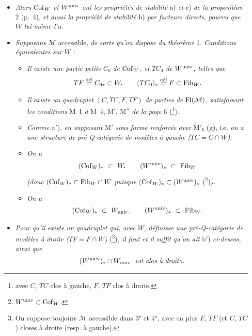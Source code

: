 \begin{itemize}[leftmargin=2.5em]
\item[\circled{1}] \textit{Alors} $\mathrm{Cof}_W$ \textit{et} $W^{\mathrm{univ}}$ \textit{ont les propriétés de stabilité} a) \textit{et} c) \textit{de la proposition} 2 (p.~4), \textit{et aussi la propriété de stabilité} b) \textit{par facteurs directs, pourvu que} $W$ \textit{lui-même l'a.}

\item[\circled{2}] \textit{Supposons} $\mathcal{M}$ accessible, \textit{de sorte qu'on dispose du théorème} 1. \textit{Conditions équivalentes sur} $W$ \textit{:}


\begin{itemize}[leftmargin=2.5em]
\item[a)] \textit{Il existe une partie petite} $C_0$ \textit{de} $\mathrm{Cof}_W$\textit{, et} $TC_0$ \textit{de} $W^{\mathrm{univ}}$\textit{, telles que}
\[ TF \overset{\text{déf}}{=} C_{0*} \subset W, \qquad (TC_0)_* \overset{\text{déf}}{=} F \subset \mathrm{Fib}_W. \]

\item[a$'$)] \textit{Il existe un quadruplet} $(C,TC,F,TF)$ \textit{de parties de} $\mathrm{Fl}(\mathcal{M})$\textit{, satisfaisant les conditions} M~1 \textit{à} M~4, M$'$, M$''$ \textit{de la page} 6 (\footnote[10]{avec $C$, $TC$ clos à gauche, $F$, $TF$ clos à droite.}).

\item[a$''$)] \textit{Comme} a$'$)\textit{, en supposant} M$'$ \textit{sous forme renforcée avec} M$'_0$ (g), i.e. \textit{on a une structure de pré-Q-catégorie de modèles à gauche (}$TC = C \cap W$\textit{).}

\item[b)] \textit{On a}
\[ (\Cof_W)_* \ \subset\ W, \qquad (W^{\univ})_* \ \subset\ \Fib_W \]
\textit{(donc} $(\mathrm{Cof}_W)_* \subset \mathrm{Fib}_W \cap W$ \textit{puisque} $(\mathrm{Cof}_W)_* \subset (W^{\mathrm{univ}})_*$ (\footnote[11]{$W^{\mathrm{univ}} \subset \mathrm{Cof}_W$.})\textit{).}

\item[b$'$)] \textit{On a}
\[ (\Cof_W)_* \ \subset\ W_{\univ}, \qquad (W^{\univ})_* \ \subset\ \Fib_W. \]
\end{itemize}

\item[\circled{3}] \textit{Pour qu'il existe un quadruplet qui, avec} $W$\textit{, définisse une pré-Q-catégorie de modèles à droite (}$TF = F \cap W$\textit{)} (\footnote[12]{On suppose toujours $\mathcal{M}$ accessible dans 3° et 4°, avec en plus $F$, $TF$ (et $C$, $TC$) closes à droite (resp. à gauche).})\textit{, il faut et il suffit qu'on ait} b$'$) \textit{ci-dessus, ainsi que}
\[ (W^{\mathrm{univ}})_* \cap W_{\mathrm{univ}} \ \ \text{\itshape est clos à droite.} \]


\end{itemize}

